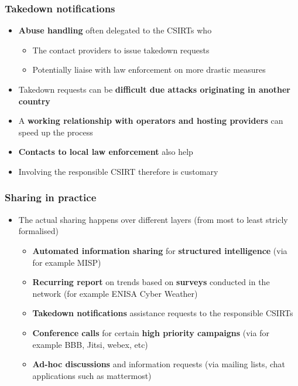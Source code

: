 \begin{frame}
    \frametitle{Takedown notifications}
    \begin{itemize}
        \item {\bf Abuse handling} often delegated to the CSIRTs who
        \begin{itemize}
            \item The contact providers to issue takedown requests
            \item Potentially liaise with law enforcement on more drastic measures
        \end{itemize}
        \item Takedown requests can be {\bf difficult due attacks originating in another country}
        \item A {\bf working relationship with operators and hosting providers} can speed up the process
        \item {\bf Contacts to local law enforcement} also help
        \item Involving the responsible CSIRT therefore is customary
    \end{itemize}

\end{frame}

\begin{frame}
    \frametitle{Sharing in practice}
    \begin{itemize}
        \item The actual sharing happens over different layers (from most to least stricly formalised)
        \begin{itemize}
            \item {\bf Automated information sharing} for {\bf structured intelligence} (via for example MISP)
            \item {\bf Recurring report} on trends based on {\bf surveys} conducted in the network (for example ENISA Cyber Weather)
            \item {\bf Takedown notifications} assistance requests to the responsible CSIRTs
            \item {\bf Conference calls} for certain {\bf high priority campaigns} (via for example BBB, Jitsi, webex, etc)
            \item {\bf Ad-hoc discussions} and information requests (via mailing lists, chat applications such as mattermost)
        \end{itemize}
    \end{itemize}

\end{frame}

